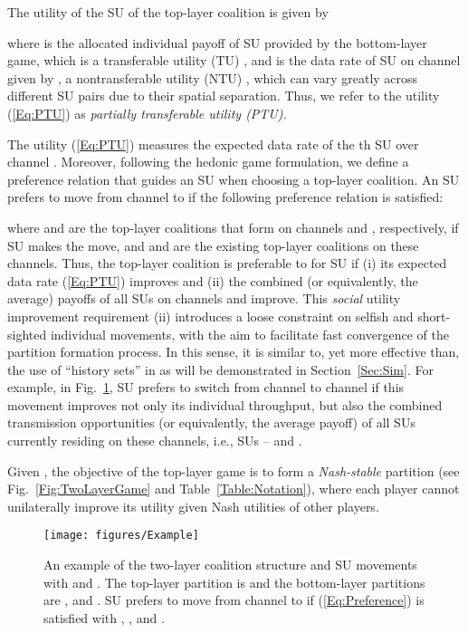 \documentclass[journal,draftclsnofoot,onecolumn]{IEEEtran}
\theoremstyle{definition}
\begin{document}
The utility of the SU  of the top-layer coalition  is given by

where  is the allocated individual payoff of SU  provided by the bottom-layer game,  which is a transferable utility (TU) \cite{CoalGameSurvey}, and  is the data rate of SU  on channel  given by , a nontransferable utility (NTU) \cite{CoalGameSurvey}, which can vary greatly across different SU pairs due to their spatial separation. Thus, we refer to the utility (\ref{Eq:PTU}) as \emph{partially transferable utility (PTU).}

The utility (\ref{Eq:PTU}) measures the expected data rate of the th SU over channel . Moreover, following the hedonic game formulation\cite{Hedonic}, we define a preference relation that guides an SU when choosing a top-layer coalition. An SU  prefers to move from channel  to  if the following preference relation is satisfied:

where  and  are the top-layer coalitions that form on channels  and , respectively, if SU  makes the move, and  and  are the existing top-layer coalitions on these channels. Thus, the top-layer coalition  is preferable to  for SU  if (i) its expected data rate (\ref{Eq:PTU}) improves and (ii) the combined (or equivalently, the average) payoffs of all SUs on channels  and  improve. This \emph{social} utility improvement requirement (ii) introduces a loose constraint on selfish and short-sighted individual movements, with the aim to facilitate fast convergence of the partition formation process. In this sense, it is similar to, yet more effective than, the use of ``history sets'' in \cite{HedonicSenseGame} as will be demonstrated in Section~\ref{Sec:Sim}. For example, in Fig.~\ref{Fig:Example}, SU  prefers to switch from channel  to channel  if this movement improves not only its individual throughput, but also the combined transmission opportunities (or equivalently, the average payoff) of all SUs currently residing on these channels, i.e., SUs -- and .

Given , the objective of the top-layer game is to form a \emph{Nash-stable} \cite{Hedonic} partition  (see Fig.~\ref{Fig:TwoLayerGame} and Table~\ref{Table:Notation}), where each player cannot unilaterally improve its utility  given Nash utilities of other players.

\begin{figure}[!t]
    \centering
    \texttt{[image: figures/Example]}
    \caption{An example of the two-layer coalition structure and SU movements  with  and . The top-layer partition is  and the bottom-layer partitions are ,  and . SU  prefers to move from channel  to  if (\ref{Eq:Preference}) is satisfied with , ,   and .}
    \label{Fig:Example}
\end{figure}
\end{document}
